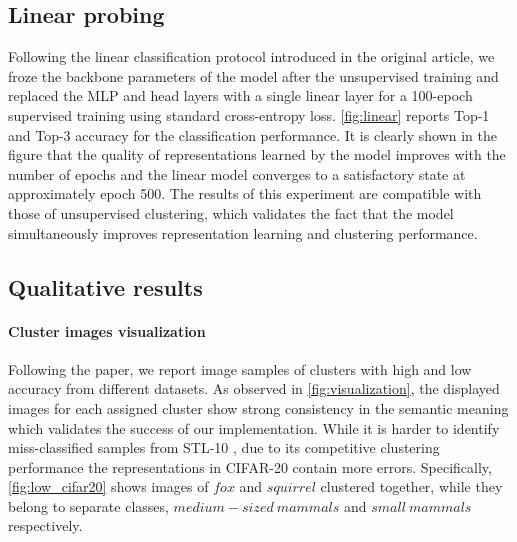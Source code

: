 \documentclass{article}
\begin{document}
\subsection{Linear probing}
Following the linear classification protocol introduced in the original article, we froze the backbone parameters of the model after the unsupervised training and replaced the MLP and head layers with a single linear layer for a 100-epoch supervised training using standard cross-entropy loss. \autoref{fig:linear} reports Top-1 and Top-3 accuracy for the classification performance. It is clearly shown in the figure that the quality of representations learned by the model improves with the number of epochs and the linear model converges to a satisfactory state at approximately epoch 500. The results of this experiment are compatible with those of unsupervised clustering, which validates the fact that the model simultaneously improves representation learning and clustering performance.


\subsection{Qualitative results}
\paragraph{Cluster images visualization} 
Following the paper, we report image samples of clusters with high and low accuracy from different datasets.
As observed in \autoref{fig:visualization}, the displayed images for each assigned cluster show strong consistency in the semantic meaning which validates the success of our implementation. While it is harder to identify miss-classified samples from STL-10 \cite{stl_10}, due to its competitive clustering performance the representations in CIFAR-20 contain more errors. Specifically, \autoref{fig:low_cifar20} shows images of $fox$ and $squirrel$ clustered together, while they belong to separate classes, $medium-sized\ mammals$ and $small\ mammals$ respectively.
\end{document}
